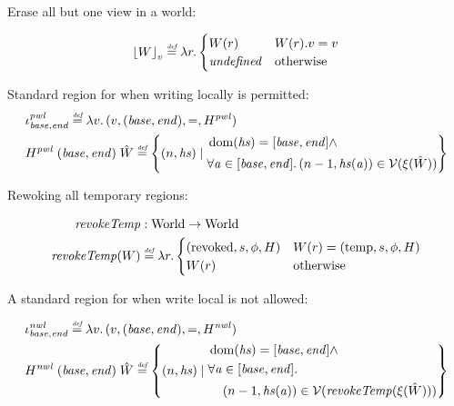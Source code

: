 \documentclass{article}
\DeclarePairedDelimiter\floor{\lfloor}{\rfloor}
\newcommand{\fun}{\rightarrow}
\newcommand{\defeq}{\stackrel{\textit{\tiny{def}}}{=}}
\DeclareMathOperator{\dom}{dom}
\newcommand{\undefined}{\mathit{undefined}}
\newcommand{\var}[1]{\mathit{#1}}
\newcommand{\hs}{\var{hs}}
\newcommand{\addr}{\var{a}}
\newcommand{\start}{\var{base}}
\newcommand{\addrend}{\var{end}}
\newcommand{\plainfun}[2]{
  \ifthenelse{\equal{#2}{}}
             {\mathit{#1}}
             {\mathit{#1}(#2)}
}
\newcommand{\revokeTemp}[1]{\plainfun{revokeTemp}{#1}}
\newcommand{\erase}[2]{\floor*{#1}_{#2}}
\newcommand{\asmType}{\plaindom{AsmType}}
\newcommand{\plaindom}[1]{\mathrm{#1}}
\newcommand{\Worlds}{\plaindom{World}}
\newcommand{\intr}[2]{\mathcal{#1}}
\newcommand{\valueintr}[1]{\intr{V}{#1}}
\newcommand{\stdvr}{\valueintr{\asmType}}
\newcommand{\npair}[2][n]{\left(#1,#2 \right)}
\newcommand{\plainview}[1]{\mathrm{#1}}
\newcommand{\temp}{\plainview{temp}}
\newcommand{\revoked}{\plainview{revoked}}
\begin{document}
Erase all but one view in a world:

\begin{align*}
  \erase{W}{v} \defeq \lambda r \ldotp 
  \begin{cases}
    W(r) & W(r).v = v\\
    \undefined & \text{otherwise}
  \end{cases}
\end{align*}

Standard region for when writing locally is permitted:
\begin{align*}
  &\iota_{\start,\addrend}^{\var{pwl}} \defeq \lambda v \ldotp (v,(\start,\addrend),=,H^{\var{pwl}}) \\ 
  &H^{\var{pwl}} \; (\start,\addrend) \; \hat{W} \defeq \left\{\npair{\hs} \mid
    \begin{aligned}
      &\dom(\hs) = [\start,\addrend] \land \\
      &\forall \addr \in [\start,\addrend] \ldotp \npair[n-1]{\hs(\addr)} \in \stdvr(\xi(\hat{W}))
    \end{aligned}
  \right\}
\end{align*}

Rewoking all temporary regions:

\begin{align*}
  \revokeTemp{} & : \Worlds \fun \Worlds \\
  \revokeTemp{W} & \defeq \lambda r \ldotp 
                   \begin{cases}
                     (\revoked,s,\phi,H) & W(r) = (\temp,s,\phi,H) \\
                     W(r)                & \text{otherwise}
                   \end{cases}
\end{align*}

A standard region for when write local is not allowed:

\begin{align*}
  &\iota_{\start,\addrend}^{\var{nwl}} \defeq \lambda v \ldotp (v,(\start,\addrend),=,H^{\var{nwl}}) \\ 
  &H^{\var{nwl}} \; (\start,\addrend) \; \hat{W} \defeq \left\{\npair{\hs} \mid
    \begin{aligned}
      &\dom(\hs) = [\start,\addrend] \land \\
      &\forall \addr \in [\start,\addrend] \ldotp \\
      &\quad \npair[n-1]{\hs(\addr)} \in \stdvr(\revokeTemp{\xi(\hat{W})})
    \end{aligned}
  \right\}
\end{align*}
\end{document}
